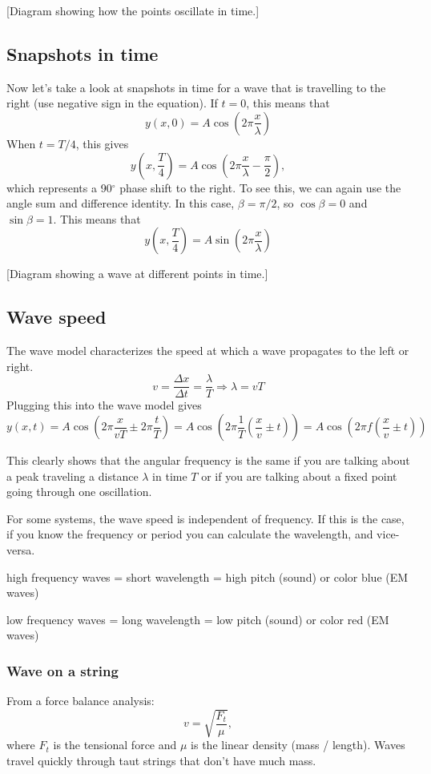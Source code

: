 [Diagram showing how the points oscillate in time.]\nopagebreak
\vspace{5cm}

\subsection{Snapshots in time}
Now let's take a look at snapshots in time for a wave that is travelling to the right (use negative sign in the equation). If $t=0$, this means that
$$y(x,0)=A\cos\left(2\pi\frac{x}{\lambda}\right)$$
When $t=T/4$, this gives
$$y\left(x,\frac{T}{4}\right)=A\cos\left(2\pi\frac{x}{\lambda}-\frac{\pi}{2}\right),$$
which represents a 90$^\circ$ phase shift to the right. To see this, we can again use the angle sum and difference identity. In this case, $\beta=\pi/2$, so $\cos\beta=0$ and $\sin\beta=1$. This means that
$$y\left(x,\frac{T}{4}\right)=A\sin\left(2\pi\frac{x}{\lambda}\right)$$

[Diagram showing a wave at different points in time.]\nopagebreak
\vspace{5cm}

\subsection{Wave speed}
The wave model characterizes the speed at which a wave propagates to the left or right.
$$v=\frac{\Delta{x}}{\Delta{t}}=\frac{\lambda}{T}\Rightarrow \lambda=vT$$
Plugging this into the wave model gives
$$y(x,t)=A\cos\left(2\pi\frac{x}{vT}\pm 2\pi\frac{t}{T}\right)=A\cos\left(2\pi\frac{1}{T}\left(\frac{x}{v}\pm t\right)\right)=A\cos\left(2\pi f\left(\frac{x}{v}\pm t\right)\right)$$

This clearly shows that the angular frequency is the same if you are talking about a peak traveling a distance $\lambda$ in time $T$ or if you are talking about a fixed point going through one oscillation.

For some systems, the wave speed is independent of frequency. If this is the case, if you know the frequency or period you can calculate the wavelength, and vice-versa.

high frequency waves = short wavelength = high pitch (sound) or color blue (EM waves)

low frequency waves = long wavelength = low pitch (sound) or color red (EM waves)

\subsubsection{Wave on a string}
From a force balance analysis:
$$v=\sqrt{\frac{F_t}{\mu}},$$
where $F_t$ is the tensional force and $\mu$ is the linear density (mass / length). Waves travel quickly through taut strings that don't have much mass.

